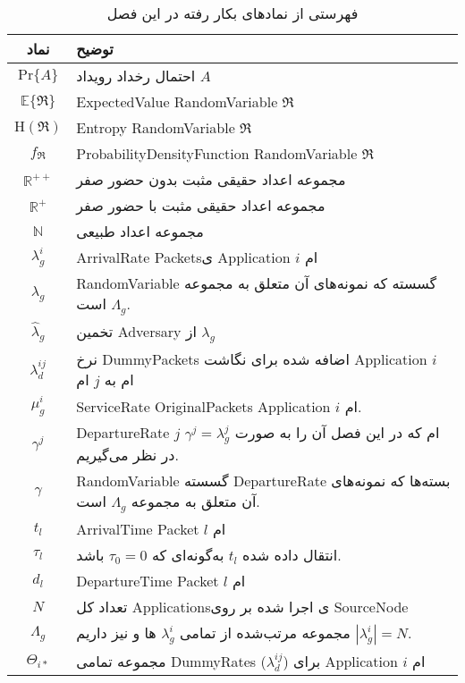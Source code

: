 \begin{table}
\renewcommand{\arraystretch}{1.8}
\caption{فهرستی از نمادهای بکار رفته در این فصل}
\begin{tabular}{cp{12.5cm}}
\toprule
نماد & توضیح
\\\midrule
$\mathrm{Pr}\{A\}$ & 
احتمال رخداد رویداد
$A$\\
 $\mathbb{E}\{\Re\}$ &  \gls*{ExpectedValue} \gls*{RandomVariable} $\Re$\\
$\mathrm{H}(\Re)$ & \gls*{Entropy}  \gls*{RandomVariable} $\Re$\\
$f_{\Re}$ & 
\gls*{ProbabilityDensityFunction} \gls*{RandomVariable} $\Re$\\
$\mathbb{R}^{++}$ & 
مجموعه اعداد حقیقی مثبت بدون حضور صفر
\\
$\mathbb{R}^{+}$ & 
مجموعه اعداد حقیقی مثبت با حضور صفر
\\
$\mathbb{N}$ & 
مجموعه اعداد طبیعی
\\\midrule
$\lambda_{g}^{i}$  & 
\gls*{ArrivalRate} \glspl*{Packet}ی \gls*{Application} $i$ ام\\
$\lambda_{g}$ & \gls*{RandomVariable}
گسسته  که نمونه‌های آن متعلق به مجموعه
$\Lambda_g$ است. \\
 $\hat{\lambda}_{g}$ & 
تخمین 
\gls*{Adversary}
از 
$\lambda_{g}$ \\
$\lambda_{d}^{ij}$ & 
نرخ 
\glspl*{DummyPacket}
اضافه شده برای نگاشت
\gls*{Application} $i$ ام  به $j$ ام\\
$\mu_{g}^i$ & \gls*{ServiceRate} \glspl*{OriginalPacket} \gls*{Application} $i$ ام.\\
$\gamma^j$ & \gls*{DepartureRate} $j$ ام که در این فصل آن را به صورت $\gamma^j=\lambda_g^j$
در نظر می‌گیریم. \\
$\gamma$ & \gls*{RandomVariable}
گسسته \gls*{DepartureRate} بسته‌ها که نمونه‌های آن متعلق به مجموعه
$\Lambda_g$ است. \\
$t_{l}$ & \gls*{ArrivalTime} \gls*{Packet} $l$ ام\\
$\tau_{l}$ & انتقال داده شده $t_{l}$ به‌گونه‌ای که $\tau_0=0$ باشد.\\
$d_{l}$ & \gls*{DepartureTime} \gls*{Packet} $l$ ام\\
\midrule
$N$ & تعداد کل \glspl*{Application}ی اجرا شده بر روی \gls*{SourceNode}\\
$\Lambda_{g}$ & 
مجموعه مرتب‌شده از تمامی 
$\lambda_g^i$ ها
و نیز داریم
$|\lambda_g^i|=N$.\\
$\Theta_{i*}$ &  
مجموعه تمامی  
\glspl*{DummyRate} ($\lambda_{d}^{ij}$) برای \gls*{Application} $i$ ام

\end{tabular}
\end{table}
